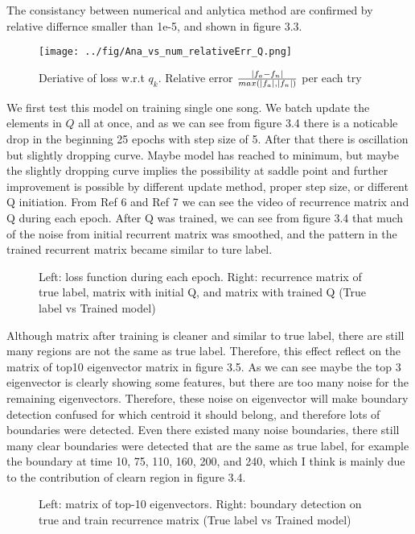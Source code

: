 \documentclass[final]{siamltexmm}
\begin{document}
The consistancy between numerical and anlytica method are confirmed by relative differnce smaller than 1e-5, and shown in figure 3.3.
\begin{figure}[H]
  \centering
    \texttt{[image: ../fig/Ana\_vs\_num\_relativeErr\_Q.png]}
  \caption{Deriative of loss w.r.t $q_k$. Relative error $|f_a - f_n| \over max(|f_a|, |f_n|)$ per each try}
\end{figure}
We first test this model on training single one song. We batch update the elements in $Q$ all at once, and as we can see from figure 3.4 there is a noticable drop in the beginning 25 epochs with step size of 5. After that there is oscillation but slightly dropping curve. Maybe model has reached to minimum, but maybe the slightly dropping curve implies the possibility at saddle point and further improvement is possible by different update method, proper step size, or different Q initiation. From Ref 6 and Ref 7 we can see the video of recurrence matrix and Q during each epoch. After Q was trained, we can see from figure 3.4 that much of the noise from initial recurrent matrix was smoothed, and the pattern in the trained recurrent matrix became similar to ture label.
\begin{figure}[H]
\centering
\caption{Left: loss function during each epoch. Right: recurrence matrix of true label, matrix with initial Q, and matrix with trained Q (True label vs Trained model)}
\end{figure}
Although matrix after training is cleaner and similar to true label, there are still many regions are not the same as true label. Therefore, this effect reflect on the matrix of top10 eigenvector matrix in figure 3.5. As we can see maybe the top 3 eigenvector is clearly showing some features, but there are too many noise for the remaining eigenvectors. Therefore, these noise on eigenvector will make boundary detection confused for which centroid it should belong, and therefore lots of boundaries were detected. Even there existed many noise boundaries, there still many clear boundaries were detected that are the same as true label, for example the boundary at time 10, 75, 110, 160, 200, and 240, which I think is mainly due to the contribution of clearn region in figure 3.4.
\begin{figure}[H]
\centering
\caption{Left: matrix of top-10 eigenvectors. Right: boundary detection on true and train recurrence matrix (True label vs Trained model)}
\end{figure}
\end{document}
